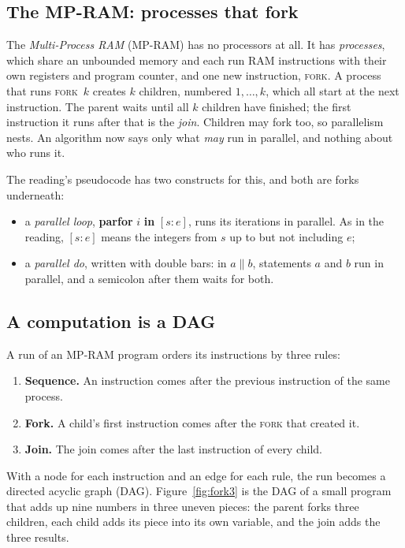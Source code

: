 \subsection{The MP-RAM: processes that fork}

The \emph{Multi-Process RAM} (MP-RAM) has no processors at all. It has \emph{processes}, which share an unbounded memory and each run RAM instructions with their own registers and program counter, and one new instruction, \textsc{fork}. A process that runs \textsc{fork}~$k$ creates $k$ children, numbered $1, \dots, k$, which all start at the next instruction. The parent waits until all $k$ children have finished; the first instruction it runs after that is the \emph{join}. Children may fork too, so parallelism nests. An algorithm now says only what \emph{may} run in parallel, and nothing about who runs it.

The reading's pseudocode has two constructs for this, and both are forks underneath:
\begin{itemize}
  \item a \emph{parallel loop}, \textbf{parfor} $i$ \textbf{in} $[s : e]$, runs its iterations in parallel. As in the reading, $[s : e]$ means the integers from $s$ up to but not including $e$;
  \item a \emph{parallel do}, written with double bars: in $a \parallel b$, statements $a$ and $b$ run in parallel, and a semicolon after them waits for both.
\end{itemize}

\subsection{A computation is a DAG}

A run of an MP-RAM program orders its instructions by three rules:
\begin{enumerate}
  \item \textbf{Sequence.} An instruction comes after the previous instruction of the same process.
  \item \textbf{Fork.} A child's first instruction comes after the \textsc{fork} that created it.
  \item \textbf{Join.} The join comes after the last instruction of every child.
\end{enumerate}
With a node for each instruction and an edge for each rule, the run becomes a directed acyclic graph (DAG). Figure~\ref{fig:fork3} is the DAG of a small program that adds up nine numbers in three uneven pieces: the parent forks three children, each child adds its piece into its own variable, and the join adds the three results.


